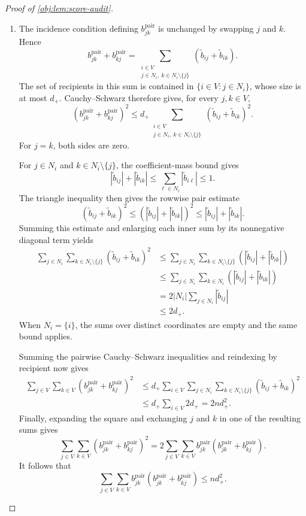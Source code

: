 \begin{proof}[Proof of \cref{obj:lem:score-audit}]
\begin{enumerate}
\item The incidence condition defining \(b^{\mathrm{pair}}_{jk}\) is unchanged by swapping \(j\) and \(k\). Hence
\[
b^{\mathrm{pair}}_{jk}+b^{\mathrm{pair}}_{kj}
=
\sum_{\substack{i\in V\\j\in N_i,\ k\in N_i\setminus\{j\}}}
(\widetilde b_{ij}+\widetilde b_{ik}).
\]
The set of recipients in this sum is contained in
\(\{i\in V:j\in N_i\}\), whose size is at most \(d_+\). Cauchy--Schwarz therefore gives, for every \(j,k\in V\),
\[
\left(b^{\mathrm{pair}}_{jk}+b^{\mathrm{pair}}_{kj}\right)^2
\le
d_+\sum_{\substack{i\in V\\j\in N_i,\ k\in N_i\setminus\{j\}}}
(\widetilde b_{ij}+\widetilde b_{ik})^2.
\]
For \(j=k\), both sides are zero.

For \(j\in N_i\) and \(k\in N_i\setminus\{j\}\), the coefficient-mass bound gives
\[
|\widetilde b_{ij}|+|\widetilde b_{ik}|
\le\sum_{\ell\in N_i}|\widetilde b_{i\ell}|
\le1.
\]
The triangle inequality then gives the rowwise pair estimate
\[
(\widetilde b_{ij}+\widetilde b_{ik})^2
\le
\left(|\widetilde b_{ij}|+|\widetilde b_{ik}|\right)^2
\le
|\widetilde b_{ij}|+|\widetilde b_{ik}|.
\]
Summing this estimate and enlarging each inner sum by its nonnegative diagonal term yields
\[
\begin{aligned}
\sum_{j\in N_i}\sum_{k\in N_i\setminus\{j\}}
(\widetilde b_{ij}+\widetilde b_{ik})^2
&\le
\sum_{j\in N_i}\sum_{k\in N_i\setminus\{j\}}
\left(|\widetilde b_{ij}|+|\widetilde b_{ik}|\right)\\
&\le
\sum_{j\in N_i}\sum_{k\in N_i}
\left(|\widetilde b_{ij}|+|\widetilde b_{ik}|\right)\\
&=2|N_i|\sum_{j\in N_i}|\widetilde b_{ij}|\\
&\le2d_+.
\end{aligned}
\]
When \(N_i=\{i\}\), the sums over distinct coordinates are empty and the same bound applies.

Summing the pairwise Cauchy--Schwarz inequalities and reindexing by recipient now gives
\[
\begin{aligned}
\sum_{j\in V}\sum_{k\in V}
\left(b^{\mathrm{pair}}_{jk}+b^{\mathrm{pair}}_{kj}\right)^2
&\le
d_+\sum_{i\in V}\sum_{j\in N_i}
\sum_{k\in N_i\setminus\{j\}}
(\widetilde b_{ij}+\widetilde b_{ik})^2\\
&\le d_+\sum_{i\in V}2d_+
=2nd_+^2.
\end{aligned}
\]
Finally, expanding the square and exchanging \(j\) and \(k\) in one of the resulting sums gives
\[
\sum_{j\in V}\sum_{k\in V}
\left(b^{\mathrm{pair}}_{jk}+b^{\mathrm{pair}}_{kj}\right)^2
=
2\sum_{j\in V}\sum_{k\in V}
b^{\mathrm{pair}}_{jk}
\left(b^{\mathrm{pair}}_{jk}+b^{\mathrm{pair}}_{kj}\right).
\]
It follows that
\[
\sum_{j\in V}\sum_{k\in V}
b^{\mathrm{pair}}_{jk}
\left(b^{\mathrm{pair}}_{jk}+b^{\mathrm{pair}}_{kj}\right)
\le nd_+^2.
\]


\end{enumerate}
\end{proof}
